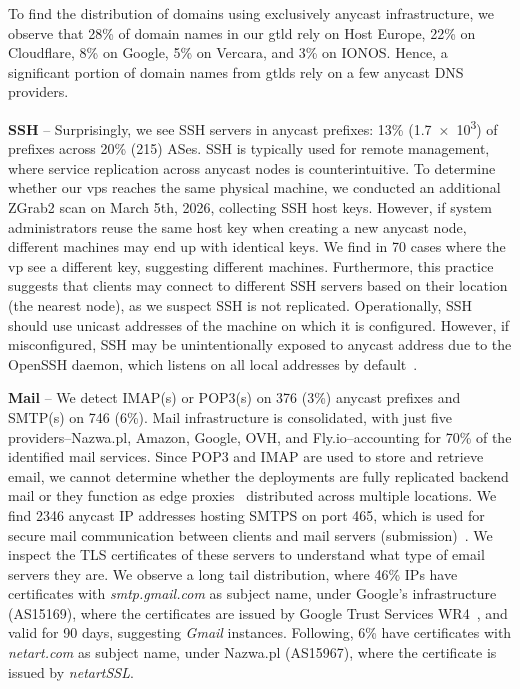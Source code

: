 To find the distribution of domains using exclusively anycast infrastructure, we observe that 28\% of domain names in our \gls{gtld} \dataset rely on Host Europe, 22\% on Cloudflare, 8\% on Google, 5\% on Vercara, and 3\% on IONOS.
Hence, a significant portion of domain names from \glspl{gtld} rely on a few anycast DNS providers.

\vspace{0.2em}\noindent\textbf{SSH}\label{subsec:ssh} --
Surprisingly, we see SSH servers in anycast prefixes: 13\% (\num{1.7e3}) of prefixes across 20\% (215) ASes.
SSH is typically used for remote management, where service replication across anycast nodes is counterintuitive.
To determine whether our \glspl{vp} reaches the same physical machine, we conducted an additional ZGrab2 scan on March 5th, 2026, collecting SSH host keys.
However, if system administrators reuse the same host key when creating a new anycast node, different machines may end up with identical keys.
We find in 70 cases where the \gls{vp} see a different key, suggesting different machines.
Furthermore, this practice suggests that clients may connect to different SSH servers based on their location (the nearest node), as we suspect SSH is not replicated.
Operationally, SSH should use unicast addresses of the machine on which it is configured.
However, if misconfigured, SSH may be unintentionally exposed to anycast address due to the OpenSSH daemon, which listens on all local addresses by default~\cite{_Sshd_config5OpenBSDManual_}.

\vspace{0.2em}\noindent\textbf{Mail} --
We detect IMAP(s) or POP3(s) on 376 (3\%) anycast prefixes and SMTP(s) on 746 (6\%).
Mail infrastructure is consolidated, with just five providers--Nazwa.pl, Amazon, Google, OVH, and Fly.io--accounting for 70\% of the identified mail services.
Since POP3 and IMAP are used to store and retrieve email, we cannot determine whether the deployments are fully replicated backend mail or they function as edge proxies~\cite{Khalidi_HowMicrosoftBuilds_2017} distributed across multiple locations.
We find \num{2346} anycast IP addresses hosting SMTPS on port 465, which is used for secure mail communication between clients and mail servers (submission)~\cite{rfc8314}.
We inspect the TLS certificates of these servers to understand what type of email servers they are.
We observe a long tail distribution, where 46\% IPs have certificates with \textit{smtp.gmail.com} as subject name, under Google's infrastructure (AS15169), where the certificates are issued by Google Trust Services WR4~\cite{_GoogleTrustServices_}, and valid for 90 days, suggesting \textit{Gmail} instances. 
Following, 6\% have certificates with \textit{netart.com} as subject name, under Nazwa.pl (AS15967), where the certificate is issued by \textit{netartSSL}.

